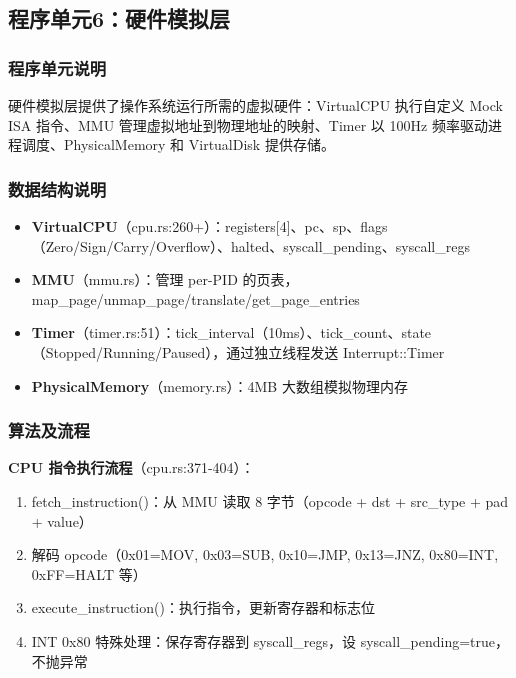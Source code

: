 \documentclass[UTF8,a4paper,12pt]{ctexart}
\begin{document}
\subsection{程序单元6：硬件模拟层}

\subsubsection{程序单元说明}

硬件模拟层提供了操作系统运行所需的虚拟硬件：VirtualCPU 执行自定义 Mock ISA 指令、MMU 管理虚拟地址到物理地址的映射、Timer 以 100Hz 频率驱动进程调度、PhysicalMemory 和 VirtualDisk 提供存储。

\subsubsection{数据结构说明}

\begin{itemize}
    \item \textbf{VirtualCPU}（cpu.rs:260+）：registers[4]、pc、sp、flags（Zero/Sign/Carry/Overflow）、halted、syscall\_pending、syscall\_regs
    \item \textbf{MMU}（mmu.rs）：管理 per-PID 的页表，map\_page/unmap\_page/translate/get\_page\_entries
    \item \textbf{Timer}（timer.rs:51）：tick\_interval（10ms）、tick\_count、state（Stopped/Running/Paused），通过独立线程发送 Interrupt::Timer
    \item \textbf{PhysicalMemory}（memory.rs）：4MB 大数组模拟物理内存
\end{itemize}

\subsubsection{算法及流程}

\textbf{CPU 指令执行流程}（cpu.rs:371-404）：

\begin{enumerate}[label=(\arabic*)]
    \item fetch\_instruction()：从 MMU 读取 8 字节（opcode + dst + src\_type + pad + value）
    \item 解码 opcode（0x01=MOV, 0x03=SUB, 0x10=JMP, 0x13=JNZ, 0x80=INT, 0xFF=HALT 等）
    \item execute\_instruction()：执行指令，更新寄存器和标志位
    \item INT 0x80 特殊处理：保存寄存器到 syscall\_regs，设 syscall\_pending=true，不抛异常
\end{enumerate}
\end{document}
